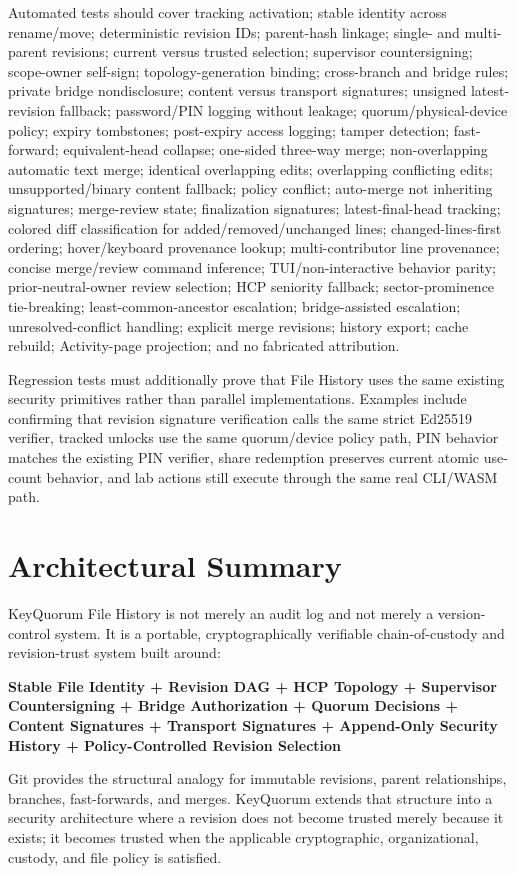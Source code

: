 \documentclass[11pt]{article}
\begin{document}
Automated tests should cover tracking activation; stable identity across rename/move; deterministic revision IDs; parent-hash linkage; single- and multi-parent revisions; current versus trusted selection; supervisor countersigning; scope-owner self-sign; topology-generation binding; cross-branch and bridge rules; private bridge nondisclosure; content versus transport signatures; unsigned latest-revision fallback; password/PIN logging without leakage; quorum/physical-device policy; expiry tombstones; post-expiry access logging; tamper detection; fast-forward; equivalent-head collapse; one-sided three-way merge; non-overlapping automatic text merge; identical overlapping edits; overlapping conflicting edits; unsupported/binary content fallback; policy conflict; auto-merge not inheriting signatures; merge-review state; finalization signatures; latest-final-head tracking; colored diff classification for added/removed/unchanged lines; changed-lines-first ordering; hover/keyboard provenance lookup; multi-contributor line provenance; concise merge/review command inference; TUI/non-interactive behavior parity; prior-neutral-owner review selection; HCP seniority fallback; sector-prominence tie-breaking; least-common-ancestor escalation; bridge-assisted escalation; unresolved-conflict handling; explicit merge revisions; history export; cache rebuild; Activity-page projection; and no fabricated attribution.

Regression tests must additionally prove that File History uses the same existing security primitives rather than parallel implementations. Examples include confirming that revision signature verification calls the same strict Ed25519 verifier, tracked unlocks use the same quorum/device policy path, PIN behavior matches the existing PIN verifier, share redemption preserves current atomic use-count behavior, and lab actions still execute through the same real CLI/WASM path.


\section{Architectural Summary}
KeyQuorum File History is not merely an audit log and not merely a version-control system. It is a portable, cryptographically verifiable chain-of-custody and revision-trust system built around:
\begin{center}
\textbf{Stable File Identity + Revision DAG + HCP Topology + Supervisor Countersigning + Bridge Authorization + Quorum Decisions + Content Signatures + Transport Signatures + Append-Only Security History + Policy-Controlled Revision Selection}
\end{center}

Git provides the structural analogy for immutable revisions, parent relationships, branches, fast-forwards, and merges. KeyQuorum extends that structure into a security architecture where a revision does not become trusted merely because it exists; it becomes trusted when the applicable cryptographic, organizational, custody, and file policy is satisfied.
\end{document}
